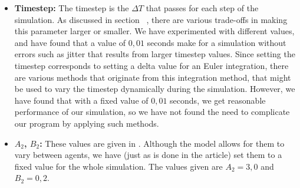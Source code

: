 \begin{itemize}
    \item \textbf{Timestep:} The timestep is the $\Delta T$ that passes for 
        each step of the simulation. As discussed in 
        section~ %
		, there are various trade-offs in making 
        this parameter larger or smaller. We have experimented with different 
        values, and have found that a value of $0,01$ seconds make for a 
        simulation without errors such as jitter that results from larger 
        timestep values. Since setting the timestep corresponds to setting a 
        delta value for an Euler integration, there are various methods that 
        originate from this integration method, that might be used to vary the 
        timestep dynamically during the simulation. However, we have found 
        that with a fixed value of $0,01$ seconds, we get reasonable 
        performance of our simulation, so we have not found the need to 
        complicate our program by applying such methods.

    \item \textbf{$A_2$, $B_2$:} These values are given in \cite{helbing00}. 
        Although the model allows for them to vary between agents, we have 
        (just as is done in the article) set them to a fixed value for the 
        whole simulation. The values given are $A_2=3,0$ and $B_2 = 0,2$.
\end{itemize}




